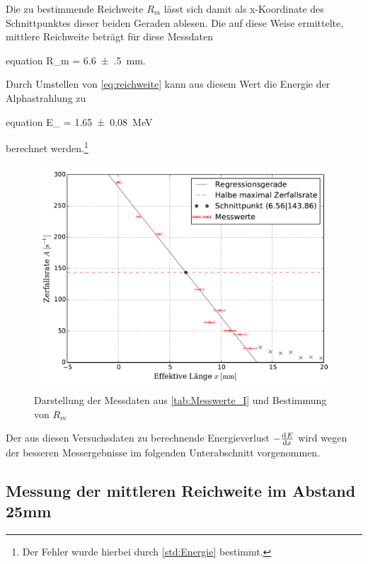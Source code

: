 	Die zu bestimmende Reichweite $R_{m}$ lässt sich damit als x-Koordinate des Schnittpunktes dieser beiden Geraden 
	ablesen. Die auf diese Weise ermittelte, mittlere Reichweite beträgt für diese Messdaten 
	\addtocounter{equation}{1}
	\begin{empheq}{equation}
		R_{m} = \SI{6.6(5)}{\milli\meter}.
		\label{eq:Messergebnis_I_R}
	\end{empheq} 
	Durch Umstellen von \cref{eq:reichweite} kann aus diesem Wert 
	die Energie der Alphastrahlung zu 
	\begin{empheq}{equation}
		E_{\alpha} = \SI{1.65(8)}{\mega\eV}
		\label{eq:Messergebnis_I_E}
	\end{empheq}	
	berechnet werden.\footnote{Der Fehler wurde hierbei durch \eqref{std:Energie} bestimmt.}    

	
	\begin{figure}[!h]
		\centering
		\includegraphics[scale=0.7]{Grafiken/MittlereReichweiteI.pdf}
		\caption{Darstellung der Messdaten aus \cref{tab:Messwerte_I} und Bestimmung von $R_{m}$}
		\label{fig:Messdaten_I}
	\end{figure}
	
	\vspace*{0.5cm}
	Der aus diesen Versuchsdaten zu berechnende Energieverlust $-\od{E}{x}$ wird wegen der besseren
	Messergebnisse im folgenden Unterabschnitt vorgenommen.  
	
	
\subsection{Messung der mittleren Reichweite im Abstand 25mm}\label{sec:Messung_II}
	
